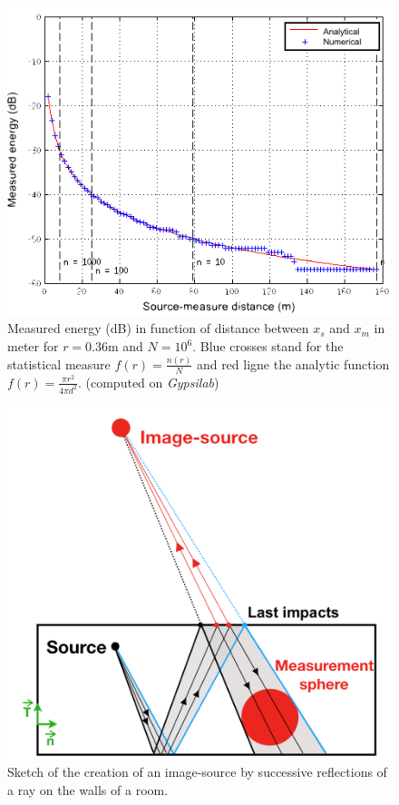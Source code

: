 \documentclass{aes2e}
\begin{document}
\begin{figure}[t]
\centering
	\includegraphics[width=\linewidth]{energie.png}
	\caption{Measured energy (dB) in function of distance between $x_s$ and $x_m$ in meter for $r = 0.36$m and $N = 10^6$. Blue crosses stand for the statistical measure $f(r) = \frac{n(r)}{N}$ and red ligne the analytic function $f(r) = \frac{\pi r^2}{4\pi d^2}$. (computed on \textit{Gypsilab})}
	\label{energie}
\end{figure}

%
\begin{figure}[t]
	\centering
	\includegraphics[width=\linewidth]{schema_SI}
	\caption{Sketch of the creation of an image-source by successive reflections of a ray on the walls of a room.}
	\label{schema_SI}
\end{figure}
\end{document}
